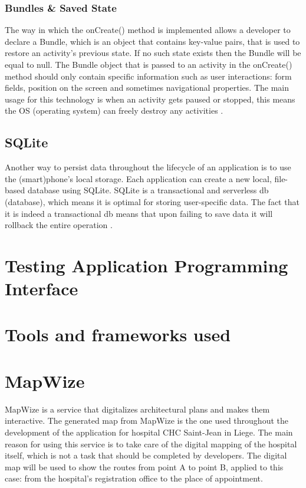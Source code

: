 \subsubsection{Bundles \& Saved State}
The way in which the onCreate() method is implemented allows a developer to declare a Bundle, which is an object that contains key-value pairs, that is used to restore an activity's previous state. If no such state exists then the Bundle will be equal to null. The Bundle object that is passed to an activity in the onCreate() method should only contain specific information such as user interactions: form fields, position on the screen and sometimes navigational properties. The main usage for this technology is when an activity gets paused or stopped, this means the OS (operating system) can freely destroy any activities \cite{JamesHalpern2012}.
\subsection{SQLite}
Another way to persist data throughout the lifecycle of an application is to use the (smart)phone's local storage. Each application can create a new local, file-based database using SQLite. SQLite is a transactional and serverless db (database), which means it is optimal for storing user-specific data. The fact that it is indeed a transactional db means that upon failing to save data it will rollback the entire operation \cite{TutorialsPoint2019}.
\section{Testing Application Programming Interface}
\section{Tools and frameworks used}
\section{MapWize}
MapWize is a service that digitalizes architectural plans and makes them interactive. The generated map from MapWize is the one used throughout the development of the application
for hospital CHC Saint-Jean in Liege. The main reason for using this service is to take care of the digital mapping of the hospital itself, which is not a task that should be completed by developers. The digital map will be used to show the routes from point A to point B, applied to this case: from the hospital's registration office to the place of appointment.
